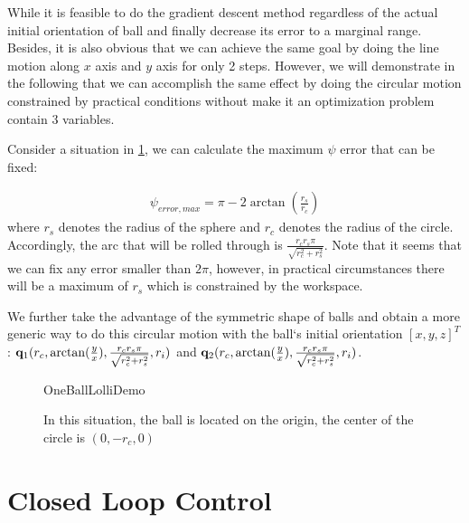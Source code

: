 \documentclass[letter paper, 10pt, conference]{ieeeconf}
\begin{document}
While it is feasible to do the gradient descent method regardless of the actual initial orientation of ball and finally decrease its error to a marginal range. Besides, it is also obvious that we can achieve the same goal by doing the line motion along $x$ axis and $y$ axis for only 2 steps. However, we will demonstrate in the following that we can accomplish the same effect by doing the circular motion constrained by practical conditions without make it an optimization problem contain 3 variables.

Consider a situation in \ref{fig:OneBallLolliDemo}, we can calculate the maximum $\psi$ error that can be fixed:

\begin{align}
\psi_{error,max}=\pi-2 \arctan\left(\frac{r_s}{r_c}\right)
\label{eq:MaxErrorFixed}
\end{align}
where $r_s$ denotes the radius of the sphere and $r_c$ denotes the radius of the circle. Accordingly, the arc that will be rolled through is $\frac{r_cr_s\pi}{\sqrt{r_c^2+r_s^2}}$. Note that it seems that we can fix any error smaller than $2\pi$, however, in practical circumstances there will be a maximum of $r_s$ which is constrained by the workspace.

We further take the advantage of the symmetric shape of balls and obtain a more generic way to do this circular motion with the ball`s initial orientation $[x,y,z]^T$: ${\bf q}_1(r_c, \arctan(\frac{y}{x}), \frac{r_cr_s\pi}{\sqrt{r_c^2+r_s^2}}, r_i)$ and ${\bf q}_2(r_c, \arctan(\frac{y}{x}), \frac{r_cr_s\pi}{\sqrt{r_c^2+r_s^2}}, r_i)$.




    \begin{figure}%
	\begin{center}
	\begin{overpic}[width=.9\columnwidth]{OneBallLolliDemo}
	\end{overpic}
	\end{center}
	\vspace{-1em}
	\caption{ \label{fig:OneBallLolliDemo} In this situation, the ball is located on the origin, the center of the circle is $(0,-r_c,0)$
}\vspace{-1em}
\end{figure}



\section{Closed Loop Control}\label{sec:ClosedLoopControl}%
\end{document}
